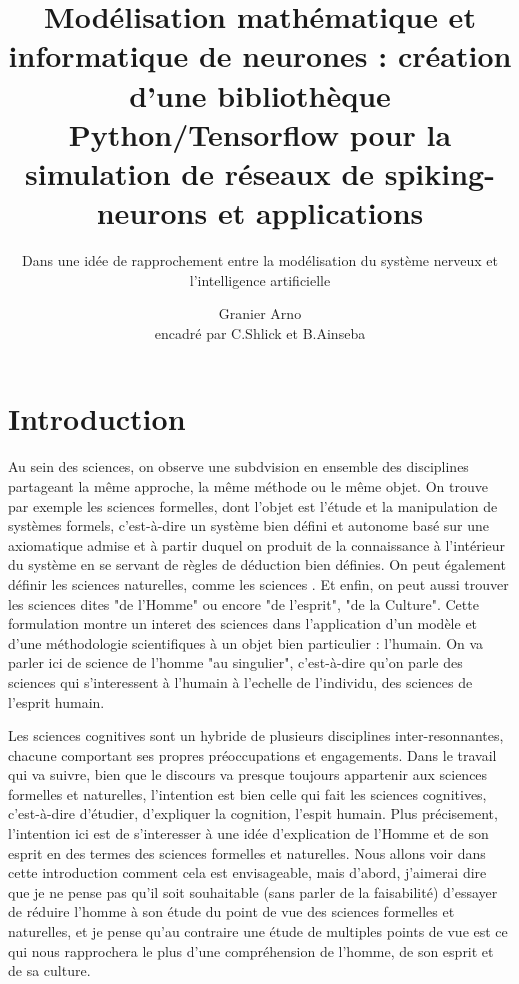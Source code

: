 \documentclass[12pt]{scrartcl}
\title{Modélisation mathématique et informatique de neurones : création d'une bibliothèque Python/Tensorflow pour la simulation de réseaux de spiking-neurons et applications }
\subtitle{Dans une idée de rapprochement entre la modélisation du système nerveux et l'intelligence artificielle}
\author{Granier Arno \\ encadré par C.Shlick et B.Ainseba}
\begin{document}
\maketitle

\tableofcontents

\pagebreak


\part{Introduction}
	
	

Au sein des sciences, on observe une subdvision en ensemble des disciplines partageant la même approche, la même méthode ou le même objet. On trouve par exemple les sciences formelles, dont l'objet est l'étude et la manipulation de systèmes formels, c'est-à-dire un système bien défini et autonome basé sur une axiomatique admise et à partir duquel on produit de la connaissance à l'intérieur du système en se servant de règles de déduction bien définies. On peut également définir les sciences naturelles, comme les sciences . Et enfin, on peut aussi trouver les sciences dites "de l'Homme" ou encore "de l'esprit", "de la Culture". Cette formulation montre un interet des sciences dans l'application d'un modèle et d'une méthodologie scientifiques à un objet bien particulier : l'humain. On va parler ici de science de l'homme "au singulier", c'est-à-dire qu'on parle des sciences qui s'interessent à l'humain à l'echelle de l'individu, des sciences de l'esprit humain.


	 Les sciences cognitives sont un hybride de plusieurs disciplines inter-resonnantes, chacune comportant ses propres préoccupations et engagements. Dans le travail qui va suivre, bien que le discours va presque toujours appartenir aux sciences formelles et naturelles, l'intention est bien celle qui fait les sciences cognitives, c'est-à-dire d'étudier, d'expliquer la cognition, l'espit humain. Plus précisement, l'intention ici est de s'interesser à une idée d'explication de l'Homme et de son esprit en des termes des sciences formelles et naturelles. Nous allons voir dans cette introduction comment cela est envisageable, mais d'abord, j'aimerai dire que je ne pense pas qu'il soit souhaitable (sans parler de la faisabilité) d'essayer de réduire l'homme à son étude du point de vue des sciences formelles et naturelles, et je pense qu'au contraire une étude de multiples points de vue est ce qui nous rapprochera le plus d'une compréhension de l'homme, de son esprit et de sa culture.
\end{document}

